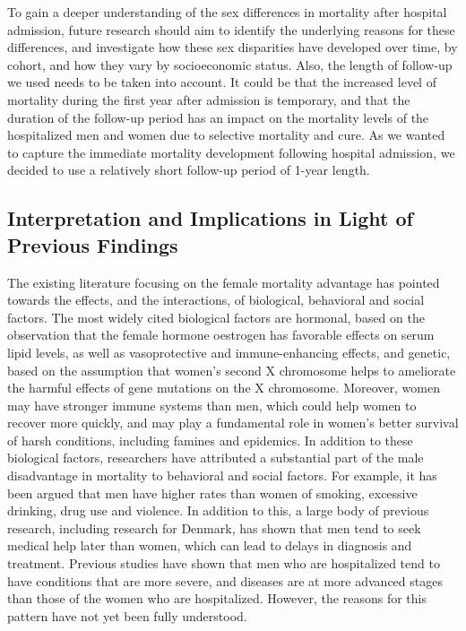 To gain a deeper understanding of the sex differences in mortality after 
hospital admission, future research should aim to identify the underlying 
reasons for these differences, and investigate how these sex disparities 
have developed over time, by cohort, and how they vary by socioeconomic 
status. Also, the length of follow-up we used needs to be taken into 
account. It could be that the increased level of mortality during the 
first year after admission is temporary, and that the duration of the 
follow-up period has an impact on the mortality levels of the hospitalized 
men and women due to selective mortality and cure. As we wanted to 
capture the immediate mortality development following hospital admission, 
we decided to use a relatively short follow-up period of 1-year length.

\subsection{Interpretation and Implications in Light of Previous Findings}
The existing literature focusing on the female mortality advantage has 
pointed towards the effects, and the interactions, of biological, behavioral 
and social factors.\citep{oksuzyan2008} The most widely cited biological 
factors are hormonal, based on the observation that the female hormone 
oestrogen has favorable effects on serum lipid levels, as well as 
vasoprotective and immune-enhancing effects, and genetic, based on the 
assumption that women's second X chromosome helps to ameliorate the harmful 
effects of gene mutations on the X chromosome.\citep{seifarth2012sex,bouman2005sex,
stindl2004,christensen2001x} Moreover, women may have stronger immune 
systems than men, which could help women to recover more quickly,\citep{oertelt2012influence} 
and may play a fundamental role in women's better survival of harsh 
conditions, including famines and epidemics.\citep{zarulli2018women} 
In addition to these biological factors, researchers have attributed 
a substantial part of the male disadvantage in mortality to behavioral and social 
factors.\citep{rieker2005rethinking} For example, it has been argued 
that men have higher rates than women of smoking, excessive drinking, 
drug use and violence.\citep{rogers2010social} In addition to this, 
a large body of previous research, including research for Denmark, 
has shown that men tend to seek medical help later than women, which 
can lead to delays in diagnosis and treatment.\citep{farrimond2012beyond,
chan2010gender,juel2008men,noone2008men,adeyemi2007men,smith2006we,smith2005patients} 
Previous studies have shown that men who are hospitalized tend to 
have conditions that are more severe, and diseases are at more advanced 
stages than those of the women who are hospitalized. However, the reasons 
for this pattern have not yet been fully understood.\citep{simmonds2014understanding}

